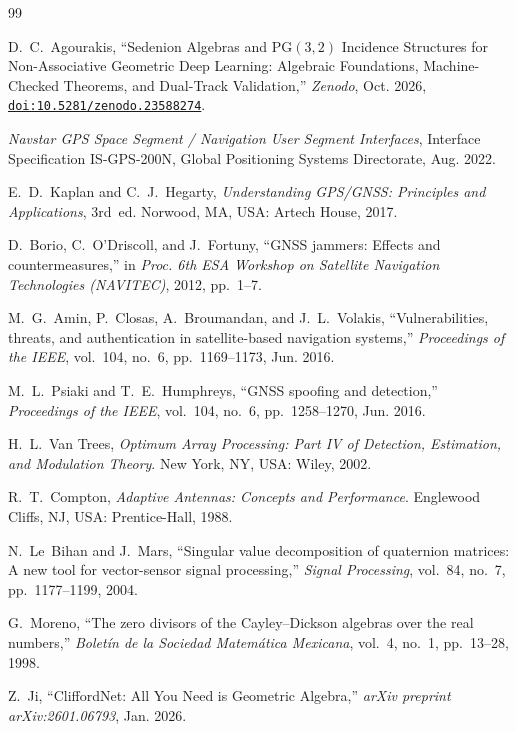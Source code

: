 \documentclass[11pt,a4paper]{article}
\theoremstyle{definition}
\theoremstyle{remark}
\newcommand{\PG}{\mathrm{PG}}
\begin{document}
\begin{thebibliography}{99}

D.~C.~Agourakis, ``Sedenion Algebras and $\PG(3,2)$ Incidence Structures for Non-Associative Geometric Deep Learning: Algebraic Foundations, Machine-Checked Theorems, and Dual-Track Validation,'' \emph{Zenodo}, Oct. 2026, \href{https://doi.org/10.5281/zenodo.23588274}{\texttt{doi:10.5281/zenodo.23588274}}.

\emph{Navstar GPS Space Segment / Navigation User Segment Interfaces}, Interface Specification IS-GPS-200N, Global Positioning Systems Directorate, Aug. 2022.

E.~D.~Kaplan and C.~J.~Hegarty, \emph{Understanding GPS/GNSS: Principles and Applications}, 3rd~ed. Norwood, MA, USA: Artech House, 2017.

D.~Borio, C.~O'Driscoll, and J.~Fortuny, ``GNSS jammers: Effects and countermeasures,'' in \emph{Proc. 6th ESA Workshop on Satellite Navigation Technologies (NAVITEC)}, 2012, pp.~1--7.

M.~G.~Amin, P.~Closas, A.~Broumandan, and J.~L.~Volakis, ``Vulnerabilities, threats, and authentication in satellite-based navigation systems,'' \emph{Proceedings of the IEEE}, vol.~104, no.~6, pp.~1169--1173, Jun. 2016.

M.~L.~Psiaki and T.~E.~Humphreys, ``GNSS spoofing and detection,'' \emph{Proceedings of the IEEE}, vol.~104, no.~6, pp.~1258--1270, Jun. 2016.

H.~L.~Van Trees, \emph{Optimum Array Processing: Part IV of Detection, Estimation, and Modulation Theory}. New York, NY, USA: Wiley, 2002.

R.~T.~Compton, \emph{Adaptive Antennas: Concepts and Performance}. Englewood Cliffs, NJ, USA: Prentice-Hall, 1988.

N.~Le~Bihan and J.~Mars, ``Singular value decomposition of quaternion matrices: A new tool for vector-sensor signal processing,'' \emph{Signal Processing}, vol.~84, no.~7, pp.~1177--1199, 2004.

G.~Moreno, ``The zero divisors of the Cayley--Dickson algebras over the real numbers,'' \emph{Bolet\'in de la Sociedad Matem\'atica Mexicana}, vol.~4, no.~1, pp.~13--28, 1998.

Z.~Ji, ``CliffordNet: All You Need is Geometric Algebra,'' \emph{arXiv preprint arXiv:2601.06793}, Jan. 2026.

\end{thebibliography}
\end{document}
